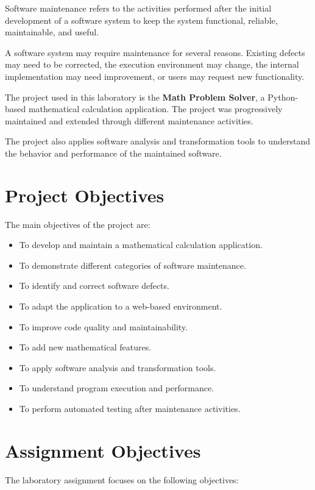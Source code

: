 \documentclass[12pt,a4paper]{report}
\begin{document}
Software maintenance refers to the activities performed after the
initial development of a software system to keep the system
functional, reliable, maintainable, and useful.

A software system may require maintenance for several reasons.
Existing defects may need to be corrected, the execution environment
may change, the internal implementation may need improvement, or users
may request new functionality.

The project used in this laboratory is the
\textbf{Math Problem Solver}, a Python-based mathematical calculation
application. The project was progressively maintained and extended
through different maintenance activities.

The project also applies software analysis and transformation tools to
understand the behavior and performance of the maintained software.

\section{Project Objectives}

The main objectives of the project are:

\begin{itemize}
    \item To develop and maintain a mathematical calculation
    application.
    \item To demonstrate different categories of software maintenance.
    \item To identify and correct software defects.
    \item To adapt the application to a web-based environment.
    \item To improve code quality and maintainability.
    \item To add new mathematical features.
    \item To apply software analysis and transformation tools.
    \item To understand program execution and performance.
    \item To perform automated testing after maintenance activities.
\end{itemize}

\section{Assignment Objectives}

The laboratory assignment focuses on the following objectives:
\end{document}
